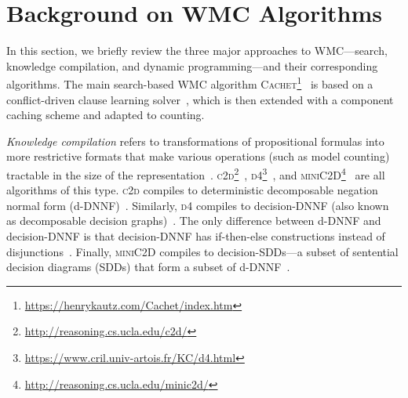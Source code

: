 \documentclass[runningheads]{llncs}
\begin{document}
\section{Background on \textsf{\textmd{WMC}} Algorithms}\label{sec:background}

In this section, we briefly review the three major approaches to
\textsf{WMC}---search, knowledge compilation, and dynamic programming---and
their corresponding algorithms. The main search-based \textsf{WMC} algorithm
\textsc{Cachet}\footnote{\url{https://henrykautz.com/Cachet/index.htm}}~\cite{DBLP:conf/sat/SangBBKP04}
is based on a conflict-driven clause learning \SAT{}
solver~\cite{DBLP:conf/dac/MoskewiczMZZM01}, which is then extended with a
component caching scheme and adapted to counting.

\emph{Knowledge compilation} refers to transformations of propositional formulas
into more restrictive formats that make various operations (such as model
counting) tractable in the size of the
representation~\cite{DBLP:journals/jair/DarwicheM02}.
\textsc{c2d}\footnote{\url{http://reasoning.cs.ucla.edu/c2d/}}~\cite{DBLP:conf/ecai/Darwiche04},
\textsc{d4}\footnote{\url{https://www.cril.univ-artois.fr/KC/d4.html}}~\cite{DBLP:conf/ijcai/LagniezM17},
and
\textsc{miniC2D}\footnote{\url{http://reasoning.cs.ucla.edu/minic2d/}}~\cite{DBLP:conf/ijcai/OztokD15}
are all algorithms of this type. \textsc{c2d} compiles to deterministic
decomposable negation normal form
(d-DNNF)~\cite{DBLP:journals/jancl/Darwiche01}. Similarly, \textsc{d4} compiles
to decision-DNNF (also known as decomposable decision
graphs)~\cite{DBLP:conf/aaai/FargierM06}. The only difference between d-DNNF and
decision-DNNF is that decision-DNNF has if-then-else constructions instead of
disjunctions~\cite{DBLP:conf/ijcai/LagniezM17}. Finally, \textsc{miniC2D}
compiles to decision-SDDs---a subset of sentential decision diagrams (SDDs) that
form a subset of d-DNNF~\cite{DBLP:conf/ijcai/Darwiche11}.
\end{document}
